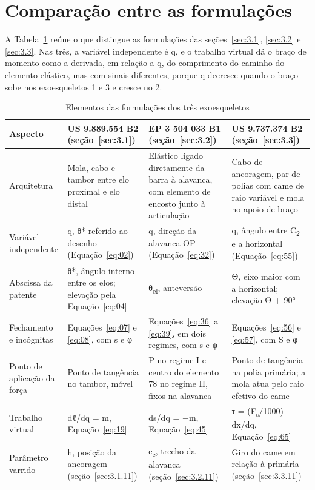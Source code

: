 \section{Comparação entre as formulações}\label{sec:3.4}

A Tabela~\ref{tab:elementos-formulacoes-tres-exoesqueletos} reúne o que distingue as formulações das seções~\ref{sec:3.1}, \ref{sec:3.2} e \ref{sec:3.3}. Nas três, a variável independente é q, e o trabalho virtual dá o braço de momento como a derivada, em relação a q, do comprimento do caminho do elemento elástico, mas com sinais diferentes, porque q decresce quando o braço sobe nos exoesqueletos 1 e 3 e cresce no 2.

\begin{table}[!htbp]
\estilotabela{\small}
\caption{Elementos das formulações dos três exoesqueletos}\label{tab:elementos-formulacoes-tres-exoesqueletos}
\begin{tabularx}{\textwidth}{@{}>{\hsize=0.641\hsize\raggedright\arraybackslash}X>{\hsize=1.120\hsize\raggedright\arraybackslash}X>{\hsize=1.120\hsize\raggedright\arraybackslash}X>{\hsize=1.120\hsize\raggedright\arraybackslash}X@{}}
\toprule
\centering\textbf{Aspecto} & \centering\textbf{US 9.889.554 B2 (seção~\ref{sec:3.1})} & \centering\textbf{EP 3 504 033 B1 (seção~\ref{sec:3.2})} & \centering\textbf{US 9.737.374 B2 (seção~\ref{sec:3.3})} \tabularnewline
\midrule
Arquitetura & Mola, cabo e tambor entre elo proximal e elo distal & Elástico ligado diretamente da barra à alavanca, com elemento de encosto junto à articulação & Cabo de ancoragem, par de polias com came de raio variável e mola no apoio de braço \\
Variável independente & q, θ* referido ao desenho (Equação~\eqref{eq:02}) & q, direção da alavanca OP (Equação~\eqref{eq:32}) & q, ângulo entre C\textsubscript{2} e a horizontal (Equação~\eqref{eq:55}) \\
Abscissa da patente & θ*, ângulo interno entre os elos; elevação pela Equação~\eqref{eq:04} & θ\textsubscript{el}, anteversão & Θ, eixo maior com a horizontal; elevação Θ + 90° \\
Fechamento e incógnitas & Equações~\eqref{eq:07} e \eqref{eq:08}, com s e φ & Equações~\eqref{eq:36} a \eqref{eq:39}, em dois regimes, com s e ψ & Equações~\eqref{eq:56} e \eqref{eq:57}, com S e φ \\
Ponto de aplicação da força & Ponto de tangência no tambor, móvel & P no regime I e centro do elemento 78 no regime II, fixos na alavanca & Ponto de tangência na polia primária; a mola atua pelo raio efetivo do came \\
Trabalho virtual & dℓ/dq = m, Equação~\eqref{eq:19} & ds/dq = −m, Equação~\eqref{eq:45} & τ = (F\textsubscript{s}/1000) dx/dq, Equação~\eqref{eq:65} \\
Parâmetro varrido & h, posição da ancoragem (seção~\ref{sec:3.1.11}) & e\textsubscript{c}, trecho da alavanca (seção~\ref{sec:3.2.11}) & Giro do came em relação à primária (seção~\ref{sec:3.3.11}) \\
\bottomrule
\end{tabularx}
\end{table}
